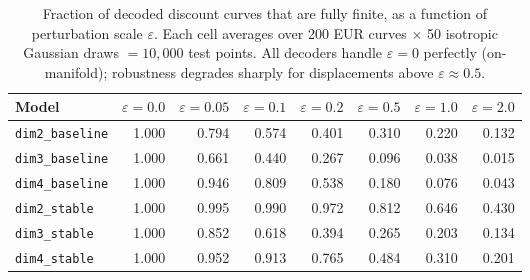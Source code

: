 \begin{table}[H]
\centering
\caption{Fraction of decoded discount curves that are fully finite, as a function of perturbation scale $\varepsilon$. Each cell averages over 200 EUR curves $\times$ 50 isotropic Gaussian draws $= 10{,}000$ test points. All decoders handle $\varepsilon = 0$ perfectly (on-manifold); robustness degrades sharply for displacements above $\varepsilon \approx 0.5$.}
\label{tab:decoder_robustness}
\small
\begin{tabular}{lrrrrrrr}
\toprule
Model & $\varepsilon = 0.0$ & $\varepsilon = 0.05$ & $\varepsilon = 0.1$ & $\varepsilon = 0.2$ & $\varepsilon = 0.5$ & $\varepsilon = 1.0$ & $\varepsilon = 2.0$ \\
\midrule
\texttt{dim2\_baseline} & 1.000 & 0.794 & 0.574 & 0.401 & 0.310 & 0.220 & 0.132 \\
\texttt{dim3\_baseline} & 1.000 & 0.661 & 0.440 & 0.267 & 0.096 & 0.038 & 0.015 \\
\texttt{dim4\_baseline} & 1.000 & 0.946 & 0.809 & 0.538 & 0.180 & 0.076 & 0.043 \\
\texttt{dim2\_stable} & 1.000 & 0.995 & 0.990 & 0.972 & 0.812 & 0.646 & 0.430 \\
\texttt{dim3\_stable} & 1.000 & 0.852 & 0.618 & 0.394 & 0.265 & 0.203 & 0.134 \\
\texttt{dim4\_stable} & 1.000 & 0.952 & 0.913 & 0.765 & 0.484 & 0.310 & 0.201 \\
\bottomrule
\end{tabular}
\end{table}
